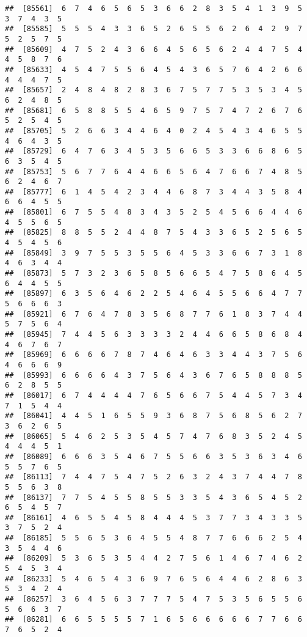 \documentclass[
]{book}
\begin{document}
\begin{verbatim}
##  [85561]  6  7  4  6  5  6  5  3  6  6  2  8  3  5  4  1  3  9  5  3  7  4  3  5
##  [85585]  5  5  5  4  3  3  6  5  2  6  5  5  6  2  6  4  2  9  7  5  2  5  7  5
##  [85609]  4  7  5  2  4  3  6  6  4  5  6  5  6  2  4  4  7  5  4  4  5  8  7  6
##  [85633]  4  5  4  7  5  5  6  4  5  4  3  6  5  7  6  4  2  6  6  4  4  4  7  5
##  [85657]  2  4  8  4  8  2  8  3  6  7  5  7  7  5  3  5  3  4  5  6  2  4  8  5
##  [85681]  6  5  8  8  5  5  4  6  5  9  7  5  7  4  7  2  6  7  6  5  2  5  4  5
##  [85705]  5  2  6  6  3  4  4  6  4  0  2  4  5  4  3  4  6  5  5  4  6  4  3  5
##  [85729]  6  4  7  6  3  4  5  3  5  6  6  5  3  3  6  6  8  6  5  6  3  5  4  5
##  [85753]  5  6  7  7  6  4  4  6  6  5  6  4  7  6  6  7  4  8  5  6  2  4  6  7
##  [85777]  6  1  4  5  4  2  3  4  4  6  8  7  3  4  4  3  5  8  4  6  6  4  5  5
##  [85801]  6  7  5  5  4  8  3  4  3  5  2  5  4  5  6  6  4  4  6  4  5  5  6  5
##  [85825]  8  8  5  5  2  4  4  8  7  5  4  3  3  6  5  2  5  6  5  4  5  4  5  6
##  [85849]  3  9  7  5  5  3  5  5  6  4  5  3  3  6  6  7  3  1  8  4  6  3  4  4
##  [85873]  5  7  3  2  3  6  5  8  5  6  6  5  4  7  5  8  6  4  5  6  4  4  5  5
##  [85897]  6  3  5  6  4  6  2  2  5  4  6  4  5  5  6  6  4  7  7  5  6  6  6  3
##  [85921]  6  7  6  4  7  8  3  5  6  8  7  7  6  1  8  3  7  4  4  5  7  5  6  4
##  [85945]  7  4  4  5  6  3  3  3  3  2  4  4  6  6  5  8  6  8  4  4  6  7  6  7
##  [85969]  6  6  6  6  7  8  7  4  6  4  6  3  3  4  4  3  7  5  6  4  6  6  6  9
##  [85993]  6  6  6  6  4  3  7  5  6  4  3  6  7  6  5  8  8  8  5  6  2  8  5  5
##  [86017]  6  7  4  4  4  4  7  6  5  6  6  7  5  4  4  5  7  3  4  7  1  5  4  4
##  [86041]  4  4  5  1  6  5  5  9  3  6  8  7  5  6  8  5  6  2  7  3  6  2  6  5
##  [86065]  5  4  6  2  5  3  5  4  5  7  4  7  6  8  3  5  2  4  5  4  4  4  5  1
##  [86089]  6  6  6  3  5  4  6  7  5  5  6  6  3  5  3  6  3  4  6  5  5  7  6  5
##  [86113]  7  4  4  7  5  4  7  5  2  6  3  2  4  3  7  4  4  7  8  5  5  6  3  8
##  [86137]  7  7  5  4  5  5  8  5  5  3  3  5  4  3  6  5  4  5  2  6  5  4  5  7
##  [86161]  4  6  5  5  4  5  8  4  4  4  5  3  7  7  3  4  3  3  5  3  7  5  2  4
##  [86185]  5  5  6  5  3  6  4  5  5  4  8  7  7  6  6  6  2  5  4  3  5  4  4  6
##  [86209]  5  3  6  5  3  5  4  4  2  7  5  6  1  4  6  7  4  6  2  5  4  5  3  4
##  [86233]  5  4  6  5  4  3  6  9  7  6  5  6  4  4  6  2  8  6  3  5  3  4  2  4
##  [86257]  3  6  4  5  6  3  7  7  7  5  4  7  5  3  5  6  5  5  6  5  6  6  3  7
##  [86281]  6  6  5  5  5  5  7  1  6  5  6  6  6  6  6  7  7  6  6  7  6  5  2  4

\end{verbatim}
\end{document}
